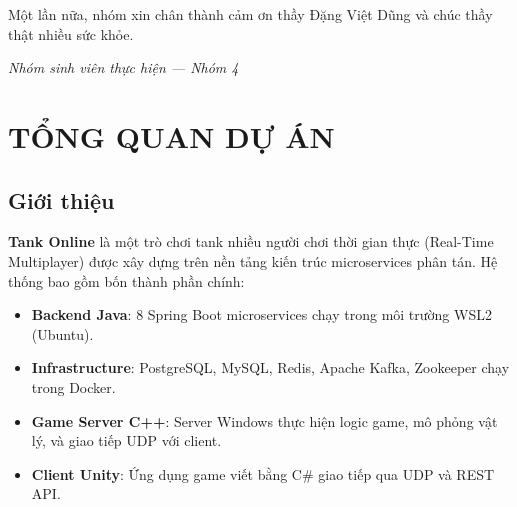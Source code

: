 \documentclass[12pt,a4paper]{report}
\begin{document}
Một lần nữa, nhóm xin chân thành cảm ơn thầy Đặng Việt Dũng và chúc thầy thật nhiều sức khỏe.

\vspace{1.5cm}
\begin{flushright}
\textit{Nhóm sinh viên thực hiện --- Nhóm 4}
\end{flushright}

\clearpage
\tableofcontents
\thispagestyle{fancy}

\listoftables
{}
\thispagestyle{fancy}

\listoffigures
{}
\thispagestyle{fancy}

\chapter{TỔNG QUAN DỰ ÁN}

\section{Giới thiệu}

\textbf{Tank Online} là một trò chơi tank nhiều người chơi thời gian thực (Real-Time Multiplayer) được xây dựng trên nền tảng kiến trúc microservices phân tán. Hệ thống bao gồm bốn thành phần chính:

\begin{itemize}
  \item \textbf{Backend Java}: 8 Spring Boot microservices chạy trong môi trường WSL2 (Ubuntu).
  \item \textbf{Infrastructure}: PostgreSQL, MySQL, Redis, Apache Kafka, Zookeeper chạy trong Docker.
  \item \textbf{Game Server C++}: Server Windows thực hiện logic game, mô phỏng vật lý, và giao tiếp UDP với client.
  \item \textbf{Client Unity}: Ứng dụng game viết bằng C\# giao tiếp qua UDP và REST API.
\end{itemize}
\end{document}
